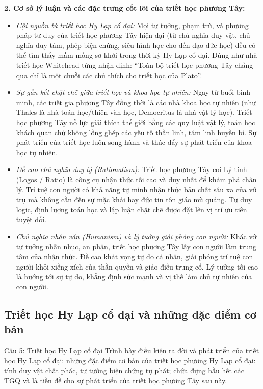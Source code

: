 \documentclass[12pt,a4paper]{article}
\begin{document}
\noindent
\textbf{2. Cơ sở lý luận và các đặc trưng cốt lõi của triết học phương Tây:}
\begin{itemize}
    \item \textit{Cội nguồn từ triết học Hy Lạp cổ đại:} Mọi tư tưởng, phạm trù, và phương pháp tư duy của triết học phương Tây hiện đại (từ chủ nghĩa duy vật, chủ nghĩa duy tâm, phép biện chứng, siêu hình học cho đến đạo đức học) đều có thể tìm thấy mầm mống sơ khởi trong thời kỳ Hy Lạp cổ đại. Đúng như nhà triết học Whitehead từng nhận định: ``Toàn bộ triết học phương Tây chẳng qua chỉ là một chuỗi các chú thích cho triết học của Plato''.
    \item \textit{Sự gắn kết chặt chẽ giữa triết học và khoa học tự nhiên:} Ngay từ buổi bình minh, các triết gia phương Tây đồng thời là các nhà khoa học tự nhiên (như Thales là nhà toán học/thiên văn học, Democritus là nhà vật lý học). Triết học phương Tây nỗ lực giải thích thế giới bằng các quy luật vật lý, toán học khách quan chứ không lồng ghép các yếu tố thần linh, tâm linh huyền bí. Sự phát triển của triết học luôn song hành và thúc đẩy sự phát triển của khoa học tự nhiên.
    \item \textit{Đề cao chủ nghĩa duy lý (Rationalism):} Triết học phương Tây coi Lý tính (Logos / Ratio) là công cụ nhận thức tối cao và duy nhất để khám phá chân lý. Trí tuệ con người có khả năng tự mình nhận thức bản chất sâu xa của vũ trụ mà không cần đến sự mặc khải hay đức tin tôn giáo mù quáng. Tư duy logic, định lượng toán học và lập luận chặt chẽ được đặt lên vị trí ưu tiên tuyệt đối.
    \item \textit{Chủ nghĩa nhân văn (Humanism) và lý tưởng giải phóng con người:} Khác với tư tưởng nhẫn nhục, an phận, triết học phương Tây lấy con người làm trung tâm của nhận thức. Đề cao khát vọng tự do cá nhân, giải phóng trí tuệ con người khỏi xiềng xích của thần quyền và giáo điều trung cổ. Lý tưởng tối cao là hướng tới sự tự do, khẳng định sức mạnh và vị thế làm chủ tự nhiên của con người.
\end{itemize}

\subsection{Triết học Hy Lạp cổ đại và những đặc điểm cơ bản}

\begin{questionbox}{Câu 5: Triết học Hy Lạp cổ đại}
Trình bày điều kiện ra đời và phát triển của triết học Hy Lạp cổ đại: những đặc điểm cơ bản của triết học phương Hy Lạp cổ đại: tính duy vật chất phác, tư tưởng biện chứng tự phát; chứa đựng hầu hết các TGQ và là tiền đề cho sự phát triển của triết học phương Tây sau này.
\end{questionbox}
\end{document}

